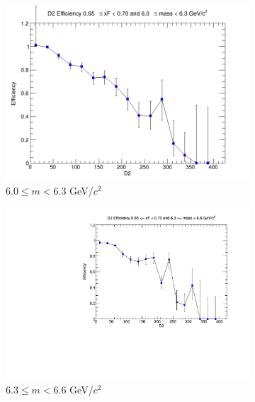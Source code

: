 \documentclass[11pt]{article}
\begin{document}
\begin{figure}[p]
\begin{subfigure}[b]{0.32\textwidth}
        \includegraphics[width=\textwidth]{./kTrackerEfficiencyPlots/D2_Efficiency_xF13_mass6.png}
        \caption{$6.0 \leq m < 6.3$ GeV/$c^2$}
    \end{subfigure}\hfill
    \begin{subfigure}[b]{0.32\textwidth}
        \centering
        \includegraphics[width=\textwidth]{./kTrackerEfficiencyPlots/D2_Efficiency_xF13_mass7.pdf}
        \caption{$6.3 \leq m < 6.6$ GeV/$c^2$}
    \end{subfigure}\hfill
    \begin{subfigure}[b]{0.32\textwidth}
        \centering

\end{subfigure}
\end{figure}
\end{document}
